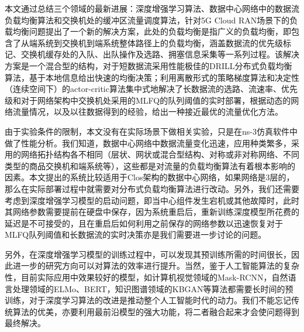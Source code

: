 
\begin{summary}

本文通过总结三个领域的最新进展：深度增强学习算法、数据中心网络中的数据流负载均衡算法和交换机处的缓冲区流量调度算法，针对5G Cloud RAN场景下的负载均衡问题提出了一个新的解决方案，此处的负载均衡是指广义的负载均衡，即包含了从端系统到交换机到端系统整体路径上的负载均衡，涵盖数据流的优先级标记、交换机缓存处的入队、出队操作及选路、拥塞信息采集等一系列过程。该解决方案是一个混合型的结构，对于短数据流采用性能极佳的DRILL分布式负载均衡算法，基于本地信息给出快速的均衡决策；利用离散形式的策略梯度算法和决定性（连续空间下）的actor-critic算法集中式地解决了长数据流的选路、流速率、优先级和对于网络架构中交换机处采用的MLFQ的队列阈值的实时部署，根据动态的网络流量情况，以及以往数据得到的经验，给出一种接近最优的流量优化方法。

由于实验条件的限制，本文没有在实际场景下做相关实验，只是在ns-3仿真软件中做了性能分析。我们知道，数据中心网络中数据流量变化迅速，应用种类繁多，采用的网络拓扑结构各不相同（层状、网状或混合型结构、对称或非对称网络、不同类型的商品交换机和端系统等），这些都是对流量的负载均衡算法有着根本影响的因素。本文提出的系统比较适用于Clos架构的数据中心网络，如果网络是3层的，那么在实际部署过程中就需要对分布式负载均衡算法进行改动。另外，我们还需要考虑到深度增强学习模型的启动问题，即当中心组件发生宕机或其他故障时，此时其网络参数需要提前在硬盘中保存，因为系统重启后，重新训练深度模型所花费的延迟是不可接受的，且在重启后如何利用之前保存的网络参数以迅速恢复对于MLFQ队列阈值和长数据流的实时决策亦是我们需要进一步讨论的问题。

另外，在深度增强学习模型的训练过程中，可以发现其预训练所需的时间很长，因此进一步的研究方向可以对算法的效率进行提升。当然，鉴于人工智能算法的复杂性，目前实际应用中效果较好的模型，如计算机视觉领域的Mask-RCNN，自然语言处理领域的ELMo、BERT，知识图谱领域的KBGAN等算法都需要长时间的预训练，对于深度学习算法的改进是推动整个人工智能时代的动力。我们不能忘记传统算法的优美，亦要利用最前沿模型的强大功能，将二者融合起来才会使问题得到最终解决。
\end{summary}

